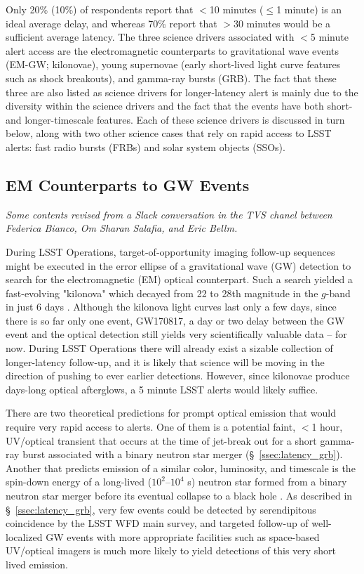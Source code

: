 \documentclass[DM,lsstdraft,authoryear,toc]{lsstdoc}
\begin{document}
Only 20\% (10\%) of respondents report that $<$10 minutes ($\leq$1 minute) is an ideal average delay, and whereas 70\% report that $>$30 minutes would be a sufficient average latency.
The three science drivers associated with $<$5 minute alert access are the electromagnetic counterparts to gravitational wave events (EM-GW; kilonovae), young supernovae (early short-lived light curve features such as shock breakouts), and gamma-ray bursts (GRB).
The fact that these three are also listed as science drivers for longer-latency alert is mainly due to the diversity within the science drivers and the fact that the events have both short- and longer-timescale features.
Each of these science drivers is discussed in turn below, along with two other science cases that rely on rapid access to LSST alerts: fast radio bursts (FRBs) and solar system objects (SSOs).

\subsection{EM Counterparts to GW Events}\label{ssec:latency_emgw}
{\it Some contents revised from a Slack conversation in the TVS chanel between Federica Bianco, Om Sharan Salafia, and Eric Bellm.}

During LSST Operations, target-of-opportunity imaging follow-up sequences might be executed in the error ellipse of a gravitational wave (GW) detection to search for the electromagnetic (EM) optical counterpart.
Such a search yielded a fast-evolving "kilonova" which decayed from 22 to 28th magnitude in the $g$-band in just 6 days \citep[faster in the bluer and slower in the redder filters][]{2017Sci...358.1559K}.
Although the kilonova light curves last only a few days, since there is so far only one event, GW170817, a day or two delay between the GW event and the optical detection still yields very scientifically valuable data -- for now.
During LSST Operations there will already exist a sizable collection of longer-latency follow-up, and it is likely that science will be moving in the direction of pushing to ever earlier detections.
However, since kilonovae produce days-long optical afterglows, a 5 minute LSST alerts would likely suffice.

There are two theoretical predictions for prompt optical emission that would require very rapid access to alerts.
One of them is a potential faint, $<$1 hour, UV/optical transient that occurs at the time of jet-break out for a short gamma-ray burst associated with a binary neutron star merger (\S~\ref{ssec:latency_grb}).
Another that predicts emission of a similar color, luminosity, and timescale is the spin-down energy of a long-lived ($10^2$--$10^4$ s) neutron star formed from a binary neutron star merger before its eventual collapse to a black hole \citep{2016ApJ...819...15S}.
As described in \S~\ref{ssec:latency_grb}, very few events could be detected by serendipitous coincidence by the LSST WFD main survey, and targeted follow-up of well-localized GW events with more appropriate facilities such as space-based UV/optical imagers is much more likely to yield detections of this very short lived emission.
\end{document}

